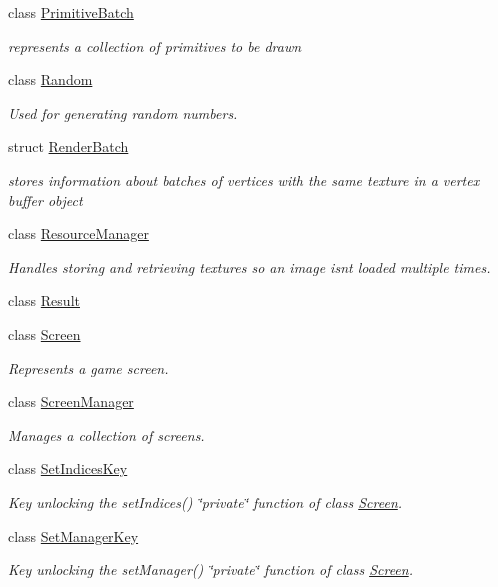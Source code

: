 \begin{DoxyCompactItemize}
class \hyperlink{classnta_1_1PrimitiveBatch}{Primitive\+Batch}
\begin{DoxyCompactList}\small\item\em represents a collection of primitives to be drawn \end{DoxyCompactList}\item 
class \hyperlink{classnta_1_1Random}{Random}
\begin{DoxyCompactList}\small\item\em Used for generating random numbers. \end{DoxyCompactList}\item 
struct \hyperlink{structnta_1_1RenderBatch}{Render\+Batch}
\begin{DoxyCompactList}\small\item\em stores information about batches of vertices with the same texture in a vertex buffer object \end{DoxyCompactList}\item 
class \hyperlink{classnta_1_1ResourceManager}{Resource\+Manager}
\begin{DoxyCompactList}\small\item\em Handles storing and retrieving textures so an image isn\textquotesingle{}t loaded multiple times. \end{DoxyCompactList}\item 
class \hyperlink{classnta_1_1Result}{Result}
\item 
class \hyperlink{classnta_1_1Screen}{Screen}
\begin{DoxyCompactList}\small\item\em Represents a game screen. \end{DoxyCompactList}\item 
class \hyperlink{classnta_1_1ScreenManager}{Screen\+Manager}
\begin{DoxyCompactList}\small\item\em Manages a collection of screens. \end{DoxyCompactList}\item 
class \hyperlink{classnta_1_1SetIndicesKey}{Set\+Indices\+Key}
\begin{DoxyCompactList}\small\item\em Key unlocking the set\+Indices() \char`\"{}private\char`\"{} function of class \hyperlink{classnta_1_1Screen}{Screen}. \end{DoxyCompactList}\item 
class \hyperlink{classnta_1_1SetManagerKey}{Set\+Manager\+Key}
\begin{DoxyCompactList}\small\item\em Key unlocking the set\+Manager() \char`\"{}private\char`\"{} function of class \hyperlink{classnta_1_1Screen}{Screen}. \end{DoxyCompactList}\item 

\end{DoxyCompactItemize}
